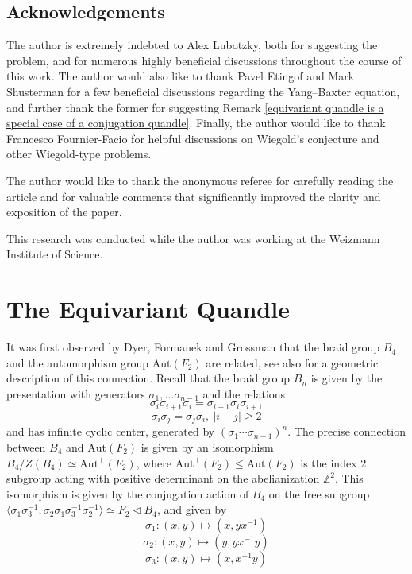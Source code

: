 \documentclass[letterpaper]{amsart}
\begin{document}
\subsection{Acknowledgements}
The author is extremely indebted to Alex Lubotzky, both for suggesting the problem, and for numerous highly beneficial discussions throughout the course of this work. The author would also like to thank Pavel Etingof and Mark Shusterman for a few beneficial discussions regarding the Yang--Baxter equation, and further thank the former for suggesting Remark \ref{equivariant quandle is a special case of a conjugation quandle}. Finally, the author would like to thank Francesco Fournier-Facio for helpful discussions on Wiegold's conjecture and other Wiegold-type problems.

The author would like to thank the anonymous referee for carefully reading the article and for valuable comments that significantly improved the clarity and exposition of the paper.

This research was conducted while the author was working at the Weizmann Institute of Science.

\section{The Equivariant Quandle}
\label{The Equivariant Quandle}
It was first observed by Dyer, Formanek and Grossman \cite{dyer1982linearity} that the braid group $B_4$ and the automorphism group $\mathrm{Aut}(F_2)$ are related, see also \cite{chen2025families} for a geometric description of this connection.
Recall that the braid group $B_n$ is given by the presentation with generators $\sigma_1,\dots\sigma_{n-1}$ and the relations
$$\sigma_i\sigma_{i+1}\sigma_i = \sigma_{i + 1}\sigma_i\sigma_{i + 1}$$
$$\sigma_i\sigma_j = \sigma_j\sigma_i, \  |i-j| \geq 2$$
and has infinite cyclic center, generated by $(\sigma_1 \cdots \sigma_{n-1})^n$.
The precise connection between $B_4$ and $\mathrm{Aut}(F_2)$ is given by an isomorphism $B_4 / Z(B_4) \simeq \mathrm{Aut}^+(F_2)$, where $\mathrm{Aut}^+(F_2) \leq \mathrm{Aut}(F_2)$ is the index $2$ subgroup acting with positive determinant on the abelianization $\mathbb{Z}^2$.
This isomorphism is given by the conjugation action of $B_4$ on the free subgroup $\langle \sigma_1\sigma_3^{-1}, \sigma_2 \sigma_1\sigma_3^{-1}\sigma_2^{-1}\rangle \simeq F_2 \triangleleft B_4$, and given by
$$\sigma_1:(x,y) \mapsto (x,yx^{-1})$$
$$\sigma_2:(x,y) \mapsto (y,yx^{-1}y)$$
$$\sigma_3:(x,y) \mapsto (x,x^{-1}y)$$
\end{document}
